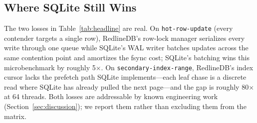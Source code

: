 \subsection{Where SQLite Still Wins}
The two losses in Table~\ref{tab:headline} are real. On
\texttt{hot-row-update} (every contender targets a single row),
RedlineDB's row-lock manager serializes every write through one
queue while SQLite's WAL writer batches updates across the same
contention point and amortizes the fsync cost; SQLite's batching wins
this microbenchmark by roughly 5$\times$.
On \texttt{secondary-index-range}, RedlineDB's index cursor lacks
the prefetch path SQLite implements---each leaf chase is a discrete
read where SQLite has already pulled the next page---and the gap is
roughly 80$\times$ at 64 threads. Both losses are addressable by
known engineering work (Section~\ref{sec:discussion}); we report
them rather than excluding them from the matrix.
